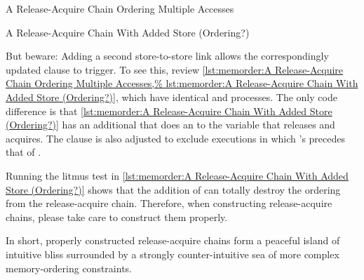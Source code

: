 \begin{listing}

\caption{A Release-Acquire Chain Ordering Multiple Accesses}
\label{lst:memorder:A Release-Acquire Chain Ordering Multiple Accesses}
\end{listing}

\begin{listing}

\caption{A Release-Acquire Chain With Added Store (Ordering?)}
\label{lst:memorder:A Release-Acquire Chain With Added Store (Ordering?)}
\end{listing}

But beware:
Adding a second store-to-store link allows the correspondingly updated
 clause to trigger.
To see this, review
\cref{lst:memorder:A Release-Acquire Chain Ordering Multiple Accesses,%
lst:memorder:A Release-Acquire Chain With Added Store (Ordering?)},
which have identical  and  processes.
The only code difference is that
\cref{lst:memorder:A Release-Acquire Chain With Added Store (Ordering?)}
has an additional  that does an  to
the  variable that  releases and  acquires.
The  clause is also adjusted to exclude executions in which
's  precedes that of .

Running the litmus test in
\cref{lst:memorder:A Release-Acquire Chain With Added Store (Ordering?)}
shows that the addition of  can totally destroy the
ordering from the release-acquire chain.
Therefore, when constructing release-acquire chains, please take care
to construct them properly.

\QuickQuizEnd

In short, properly constructed release-acquire chains form a peaceful
island of intuitive bliss surrounded by a strongly counter-intuitive
sea of more complex memory-ordering constraints.

